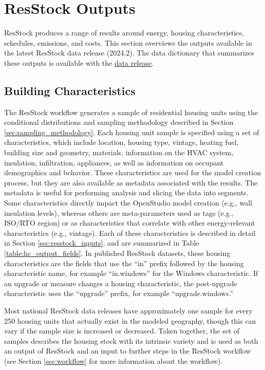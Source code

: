 \chapter{ResStock Outputs}\label{sec:resstock_outputs}
ResStock produces a range of results around energy, housing characteristics, schedules, emissions, and costs. This section overviews the outputs available in the latest ResStock data release (2024.2). The data dictionary that summarizes these outputs is available with the \href{https://oedi-data-lake.s3.amazonaws.com/nrel-pds-building-stock/end-use-load-profiles-for-us-building-stock/2024/resstock_amy2018_release_2/data_dictionary.tsv}{data release}.  

\section{Building Characteristics}
The ResStock workflow generates a sample of residential housing units using the conditional distributions and sampling methodology described in Section \ref{sec:sampling_methodology}. Each housing unit sample is specified using a set of characteristics, which include location, housing type, vintage,  heating fuel, building size and geometry, materials, information on the HVAC system, insulation, infiltration, appliances, as well as information on occupant demographics and  behavior. These characteristics are used for the model creation process, but they are also available as metadata associated with the results. The metadata is useful for performing analysis and slicing the data into segments. Some characteristics directly impact the OpenStudio model creation (e.g., wall insulation levels), whereas others are meta-parameters used as tags (e.g., ISO/RTO region) or as characteristics that correlate with other energy-relevant characteristics (e.g., vintage). Each of these characteristics is described in detail in Section \ref{sec:resstock_inputs}, and are summarized in Table \ref{table:hc_output_fields}. In published ResStock datasets, these housing characteristics are the fields that use the ``in'' prefix followed by the housing characteristic name, for example ``in.windows'' for the Windows characteristic. If an upgrade or measure changes a housing characteristic, the post-upgrade characteristic uses the ``upgrade'' prefix, for example ``upgrade.windows.'' 

Most national ResStock data releases have approximately one sample for every 250 housing units that actually exist in the modeled geography, though this can vary if the sample size is increased or decreased. Taken together, the set of samples describes the housing stock with its intrinsic variety and is used as both an output of ResStock and an input to further steps in the ResStock workflow (see Section \ref{sec:workflow} for more information about the workflow). 

